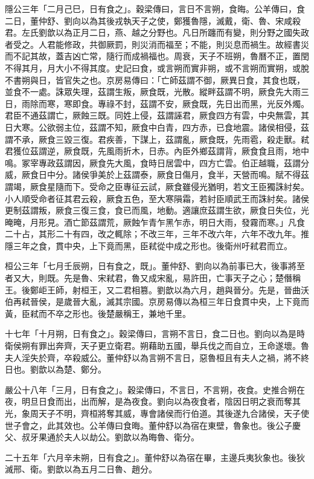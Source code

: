 \begin{pinyinscope}
隱公三年「二月己巳，日有食之」。穀梁傳曰，言日不言朔，食晦。公羊傳曰，食二日，董仲舒、劉向以為其後戎執天子之使，鄭獲魯隱，滅戴，衛、魯、宋咸殺君。左氏劉歆以為正月二日，燕、越之分野也。凡日所躔而有變，則分野之國失政者受之。人君能修政，共御厥罰，則災消而福至；不能，則災息而禍生。故經書災而不記其故，蓋吉凶亡常，隨行而成禍福也。周衰，天子不班朔，魯曆不正，置閏不得其月，月大小不得其度。史記曰食，或言朔而實非朔，或不言朔而實朔，或脫不書朔與日，皆官失之也。京房易傳曰：「亡師茲謂不御，厥異日食，其食也既，並食不一處。誅眾失理，茲謂生叛，厥食既，光散。縱畔茲謂不明，厥食先大雨三日，雨除而寒，寒即食。專祿不封，茲謂不安，厥食既，先日出而黑，光反外燭。君臣不通茲謂亡，厥蝕三既。同姓上侵，茲謂誣君，厥食四方有雲，中央無雲，其日大寒。公欲弱主位，茲謂不知，厥食中白青，四方赤，已食地震。諸侯相侵，茲謂不承，厥食三毀三復。君疾善，下謀上，茲謂亂，厥食既，先雨雹，殺走獸。弒君獲位茲謂逆，厥食既，先風雨折木，日赤。內臣外鄉茲謂背，厥食食且雨，地中鳴。冢宰專政茲謂因，厥食先大風，食時日居雲中，四方亡雲。伯正越職，茲謂分威，厥食日中分。諸侯爭美於上茲謂泰，厥食日傷月，食半，天營而鳴。賦不得茲謂竭，厥食星隨而下。受命之臣專征云試，厥食雖侵光猶明，若文王臣獨誅紂矣。小人順受命者征其君云殺，厥食五色，至大寒隕霜，若紂臣順武王而誅紂矣。諸侯更制茲謂叛，厥食三復三食，食已而風，地動。適讓庶茲謂生欲，厥食日失位，光晻晻，月形見。酒亡節茲謂荒，厥蝕乍青乍黑乍赤，明日大雨，發霧而寒。」凡食二十占，其形二十有四，改之輒除；不改三年，三年不改六年，六年不改九年。推隱三年之食，貫中央，上下竟而黑，臣弒從中成之形也。後衛州吁弒君而立。

桓公三年「七月壬辰朔，日有食之，既」。董仲舒、劉向以為前事已大，後事將至者又大，則既。先是魯、宋弒君，魯又成宋亂，易許田，亡事天子之心；楚僭稱王。後鄭岠王師，射桓王，又二君相篡。劉歆以為六月，趙與晉分。先是，晉曲沃伯再弒晉侯，是歲晉大亂，滅其宗國。京房易傳以為桓三年日食貫中央，上下竟而黃，臣弒而不卒之形也。後楚嚴稱王，兼地千里。

十七年「十月朔，日有食之」。穀梁傳曰，言朔不言日，食二日也。劉向以為是時衛侯朔有罪出奔齊，天子更立衛君。朔藉助五國，舉兵伐之而自立，王命遂壞。魯夫人淫失於齊，卒殺威公。董仲舒以為言朔不言日，惡魯桓且有夫人之禍，將不終日也。劉歆以為楚、鄭分。

嚴公十八年「三月，日有食之」。穀梁傳曰，不言日，不言朔，夜食。史推合朔在夜，明旦日食而出，出而解，是為夜食。劉向以為夜食者，陰因日明之衰而奪其光，象周天子不明，齊桓將奪其威，專會諸侯而行伯道。其後遂九合諸侯，天子使世子會之，此其效也。公羊傳曰食晦。董仲舒以為宿在東壁，魯象也。後公子慶父、叔牙果通於夫人以劫公。劉歆以為晦魯、衛分。

二十五年「六月辛未朔，日有食之」。董仲舒以為宿在畢，主邊兵夷狄象也。後狄滅邢、衛。劉歆以為五月二日魯、趙分。


\end{pinyinscope}
